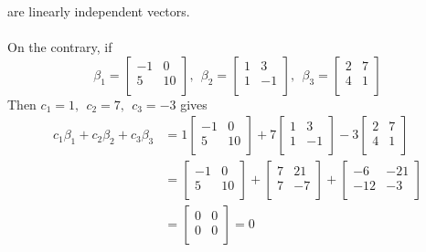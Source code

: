 are linearly independent vectors.
\\\\
On the contrary, if
$$
\beta_{1} = \begin{bmatrix}
    -1 & 0 \\
    5 & 10 \\
    \end{bmatrix}, \:\:
\beta_{2} = \begin{bmatrix}
    1 & 3 \\
    1 & -1 \\
    \end{bmatrix}, \:\:
\beta_{3}= \begin{bmatrix}
    2 & 7 \\
    4 & 1 \\
    \end{bmatrix}
$$
Then $c_1=1, \:\: c_2=7, \:\: c_{3}=-3$ gives
$$
\begin{aligned}
c_{1}\beta_{1}+c_2\beta_{2}+c_3\beta_{3}
&=  1\begin{bmatrix}
    -1 & 0 \\
    5 & 10 \\
    \end{bmatrix} + 7\begin{bmatrix}
    1 & 3 \\
    1 & -1 \\
    \end{bmatrix} -3\begin{bmatrix}
    2 & 7 \\
    4 & 1 \\
    \end{bmatrix}\\
&= \begin{bmatrix}
    -1 & 0 \\
    5 & 10 \\
    \end{bmatrix}+
\begin{bmatrix}
    7 & 21 \\
    7 & -7 \\
    \end{bmatrix}+
\begin{bmatrix}
    -6 & -21 \\
    -12 & -3 \\
    \end{bmatrix}\\
&=\begin{bmatrix}
0 & 0 \\
0 & 0 \\
\end{bmatrix}=0
\end{aligned}
$$
